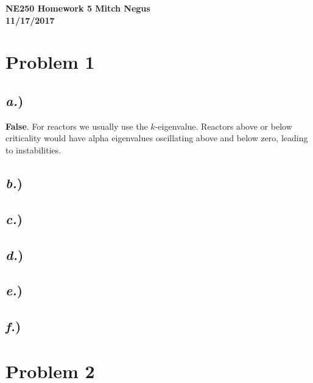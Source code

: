 \documentclass{article}
\begin{document}
\thispagestyle{empty}

{\bf {\large {NE250 Homework {5} \hfill Mitch Negus\\
		\hspace*{\fill} 11/17/2017\\ }}}
		
		
		

\section*{Problem 1}

\subsection*{\textit{a.})}
\textbf{False}. For reactors we usually use the $k$-eigenvalue. Reactors above or below criticality would have alpha eigenvalues oscillating above and below zero, leading to instabilities.
\subsection*{\textit{b.})}
\subsection*{\textit{c.})}
\subsection*{\textit{d.})}
\subsection*{\textit{e.})}
\subsection*{\textit{f.})}




\section*{Problem 2}




\end{document}
